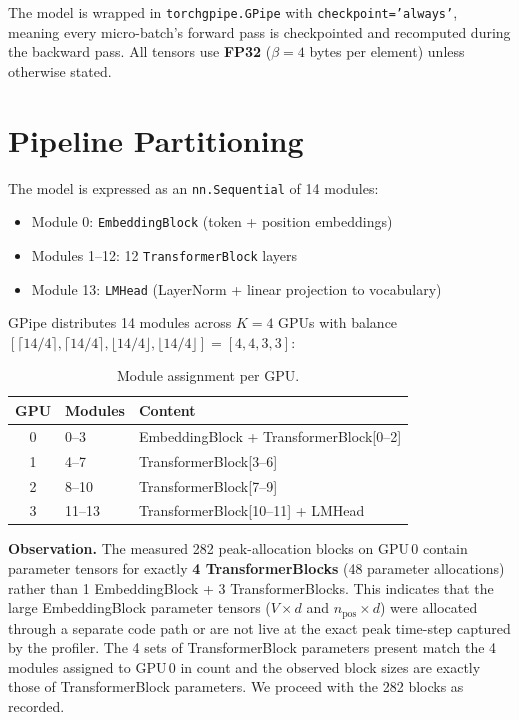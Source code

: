 \documentclass[11pt,a4paper]{article}
\begin{document}
The model is wrapped in \texttt{torchgpipe.GPipe} with \texttt{checkpoint='always'}, meaning every micro-batch's forward pass is checkpointed and recomputed during the backward pass.
All tensors use \textbf{FP32} ($\beta = 4$ bytes per element) unless otherwise stated.

\section{Pipeline Partitioning}
\label{sec:partitioning}

The model is expressed as an \texttt{nn.Sequential} of 14 modules:
\begin{itemize}
  \item Module 0: \texttt{EmbeddingBlock} (token + position embeddings)
  \item Modules 1--12: 12 \texttt{TransformerBlock} layers
  \item Module 13: \texttt{LMHead} (LayerNorm + linear projection to vocabulary)
\end{itemize}

GPipe distributes 14 modules across $K=4$ GPUs with balance $[\lceil 14/4 \rceil, \lceil 14/4 \rceil, \lfloor 14/4 \rfloor, \lfloor 14/4 \rfloor] = [4, 4, 3, 3]$:

\begin{table}[h]
\centering
\caption{Module assignment per GPU.}
\label{tab:balance}
\begin{tabular}{cll}
\toprule
\textbf{GPU} & \textbf{Modules} & \textbf{Content} \\
\midrule
0 & 0--3 & EmbeddingBlock + TransformerBlock[0--2] \\
1 & 4--7 & TransformerBlock[3--6] \\
2 & 8--10 & TransformerBlock[7--9] \\
3 & 11--13 & TransformerBlock[10--11] + LMHead \\
\bottomrule
\end{tabular}
\end{table}

\noindent\textbf{Observation.}
The measured 282 peak-allocation blocks on GPU\,0 contain parameter tensors for exactly \textbf{4 TransformerBlocks} (48 parameter allocations) rather than 1 EmbeddingBlock + 3 TransformerBlocks. This indicates that the large EmbeddingBlock parameter tensors ($V \times d$ and $n_{\text{pos}} \times d$) were allocated through a separate code path or are not live at the exact peak time-step captured by the profiler.
The 4 sets of TransformerBlock parameters present match the 4 modules assigned to GPU\,0 in count
and the observed block sizes are exactly those of TransformerBlock parameters.  We proceed with the 282 blocks as recorded.
\end{document}
